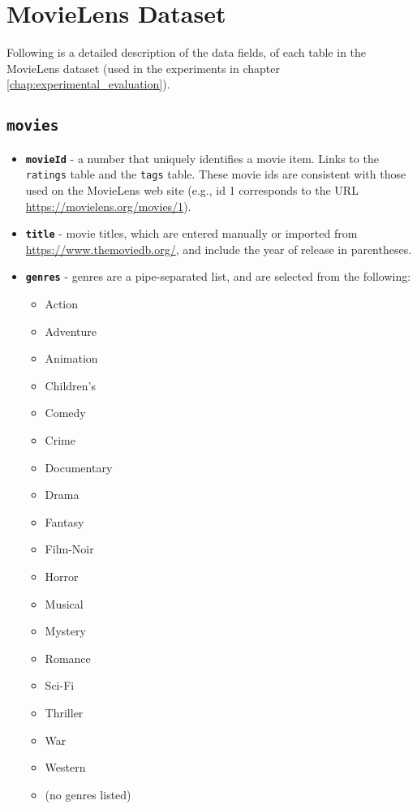 \chapter{MovieLens Dataset}
\label{appendix:movielens_schema}

Following is a detailed description of the data fields, of each table in the MovieLens dataset (used in the experiments in chapter \ref{chap:experimental_evaluation}).

\section{\texttt{movies}}\label{appendix:sec:movies}
\begin{itemize}
    \item \textbf{\texttt{movieId}} - a number that uniquely identifies a movie item. Links to the \texttt{ratings} table and the \texttt{tags} table. These movie ids are consistent with those used on the MovieLens web site (e.g., id 1 corresponds to the URL \url{https://movielens.org/movies/1}).
    \item \textbf{\texttt{title}} - movie titles, which are entered manually or imported from \url{https://www.themoviedb.org/}, and include the year of release in parentheses.
    \item \textbf{\texttt{genres}} - genres are a pipe-separated list, and are selected from the following:
    \begin{itemize}
        \item Action
        \item Adventure
        \item Animation
        \item Children's
        \item Comedy
        \item Crime
        \item Documentary
        \item Drama
        \item Fantasy
        \item Film-Noir
        \item Horror
        \item Musical
        \item Mystery
        \item Romance
        \item Sci-Fi
        \item Thriller
        \item War
        \item Western
        \item (no genres listed)
    \end{itemize}
\end{itemize}
% 

